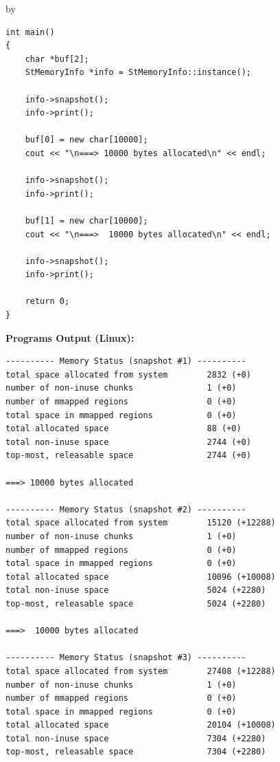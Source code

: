\documentclass[twoside]{article}
\newcommand{\entrylabel}[1]{\mbox{\textbf{{#1}}}\hfil}%
\newenvironment{entry}
{\begin{list}{}%
    {\renewcommand{\makelabel}{\entrylabel}%
     \setlength{\labelwidth}{90pt}%
     \setlength{\leftmargin}{\labelwidth}
     \advance\leftmargin by \labelsep%
      }%
    }%
  {\end{list}}
\newcommand{\Entrylabel}[1]%
{\raisebox{0pt}[1ex][0pt]{\makebox[\labelwidth][l]%
    {\parbox[t]{\labelwidth}{\hspace{0pt}\textbf{{#1}}}}}}
\newenvironment{Entry}%
{\renewcommand{\entrylabel}{\Entrylabel}\begin{entry}}%
  {\end{entry}}
\begin{document}
\begin{Entry}
{\begin{verbatim}
int main()
{
    char *buf[2];
    StMemoryInfo *info = StMemoryInfo::instance();
    
    info->snapshot();
    info->print();

    buf[0] = new char[10000];
    cout << "\n===> 10000 bytes allocated\n" << endl;

    info->snapshot();
    info->print();

    buf[1] = new char[10000];
    cout << "\n===>  10000 bytes allocated\n" << endl;

    info->snapshot();
    info->print();

    return 0;
}
\end{verbatim}
}%
{\bf Programs Output (Linux):}
{\footnotesize
\begin{verbatim}
---------- Memory Status (snapshot #1) ----------
total space allocated from system        2832 (+0) 
number of non-inuse chunks               1 (+0) 
number of mmapped regions                0 (+0) 
total space in mmapped regions           0 (+0) 
total allocated space                    88 (+0) 
total non-inuse space                    2744 (+0) 
top-most, releasable space               2744 (+0) 

===> 10000 bytes allocated

---------- Memory Status (snapshot #2) ----------
total space allocated from system        15120 (+12288) 
number of non-inuse chunks               1 (+0) 
number of mmapped regions                0 (+0) 
total space in mmapped regions           0 (+0) 
total allocated space                    10096 (+10008) 
total non-inuse space                    5024 (+2280) 
top-most, releasable space               5024 (+2280) 

===>  10000 bytes allocated

---------- Memory Status (snapshot #3) ----------
total space allocated from system        27408 (+12288) 
number of non-inuse chunks               1 (+0) 
number of mmapped regions                0 (+0) 
total space in mmapped regions           0 (+0) 
total allocated space                    20104 (+10008) 
total non-inuse space                    7304 (+2280) 
top-most, releasable space               7304 (+2280) 
\end{verbatim}
} %
\end{Entry}

\clearpage

%
%
\end{document}
